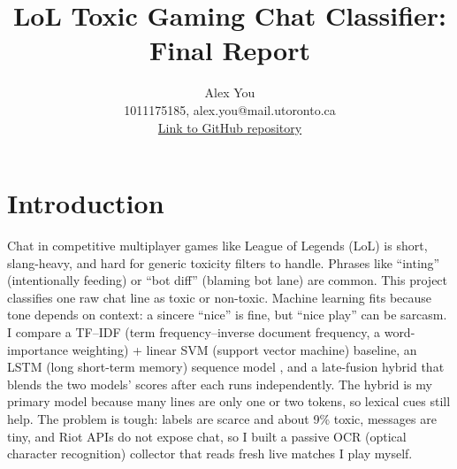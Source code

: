 \usepackage[main]{aps360}
\usepackage[utf8]{inputenc} %
\usepackage[T1]{fontenc}    %
\usepackage{hyperref}       %
\usepackage{url}            %
\usepackage{booktabs}       %
\usepackage{amsmath}        %
\usepackage{amsfonts}       %
\usepackage{nicefrac}       %
\usepackage{microtype}      %
\usepackage{xcolor}         %
\usepackage{graphicx}       %
\usepackage{caption}        %
\captionsetup{
  justification=centering,
  singlelinecheck=false,
  skip=10pt,
  position=bottom
}
\setlength{\abovecaptionskip}{10pt}
\setlength{\belowcaptionskip}{2pt}
\setlength{\intextsep}{6pt}
\setlength{\textfloatsep}{6pt}
\setlength{\floatsep}{6pt}


\title{LoL Toxic Gaming Chat Classifier: Final Report}

\author{%
  Alex You \\
  1011175185, alex.you@mail.utoronto.ca\\
  \href{https://github.com/youalex018/aps360-final-project}{Link to GitHub repository}\\
}



\maketitle

\vspace{-0.5in}

\section*{Introduction}

Chat in competitive multiplayer games like League of Legends (LoL) is short, slang-heavy, and hard for generic toxicity filters to handle. Phrases like ``inting'' (intentionally feeding) or ``bot diff'' (blaming bot lane) are common. This project classifies one raw chat line as toxic or non-toxic. Machine learning fits because tone depends on context: a sincere ``nice'' is fine, but ``nice play'' can be sarcasm. I compare a TF--IDF (term frequency--inverse document frequency, a word-importance weighting) + linear SVM (support vector machine) baseline, an LSTM (long short-term memory) sequence model \cite{hochreiter1997}, and a late-fusion hybrid that blends the two models' scores after each runs independently. The hybrid is my primary model because many lines are only one or two tokens, so lexical cues still help. The problem is tough: labels are scarce and about 9\% toxic, messages are tiny, and Riot APIs do not expose chat, so I built a passive OCR (optical character recognition) collector that reads fresh live matches I play myself.

